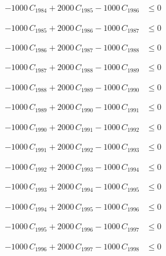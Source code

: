 \documentclass[a4paper,11pt]{article}
\begin{document}
\begin{align}
-1000\,C_{1984} + 2000\,C_{1985} - 1000\,C_{1986} &\leq 0 \nonumber
\end{align}

\begin{align}
-1000\,C_{1985} + 2000\,C_{1986} - 1000\,C_{1987} &\leq 0 \nonumber
\end{align}

\begin{align}
-1000\,C_{1986} + 2000\,C_{1987} - 1000\,C_{1988} &\leq 0 \nonumber
\end{align}

\begin{align}
-1000\,C_{1987} + 2000\,C_{1988} - 1000\,C_{1989} &\leq 0 \nonumber
\end{align}

\begin{align}
-1000\,C_{1988} + 2000\,C_{1989} - 1000\,C_{1990} &\leq 0 \nonumber
\end{align}

\begin{align}
-1000\,C_{1989} + 2000\,C_{1990} - 1000\,C_{1991} &\leq 0 \nonumber
\end{align}

\begin{align}
-1000\,C_{1990} + 2000\,C_{1991} - 1000\,C_{1992} &\leq 0 \nonumber
\end{align}

\begin{align}
-1000\,C_{1991} + 2000\,C_{1992} - 1000\,C_{1993} &\leq 0 \nonumber
\end{align}

\begin{align}
-1000\,C_{1992} + 2000\,C_{1993} - 1000\,C_{1994} &\leq 0 \nonumber
\end{align}

\begin{align}
-1000\,C_{1993} + 2000\,C_{1994} - 1000\,C_{1995} &\leq 0 \nonumber
\end{align}

\begin{align}
-1000\,C_{1994} + 2000\,C_{1995} - 1000\,C_{1996} &\leq 0 \nonumber
\end{align}

\begin{align}
-1000\,C_{1995} + 2000\,C_{1996} - 1000\,C_{1997} &\leq 0 \nonumber
\end{align}

\begin{align}
-1000\,C_{1996} + 2000\,C_{1997} - 1000\,C_{1998} &\leq 0 \nonumber
\end{align}
\end{document}
